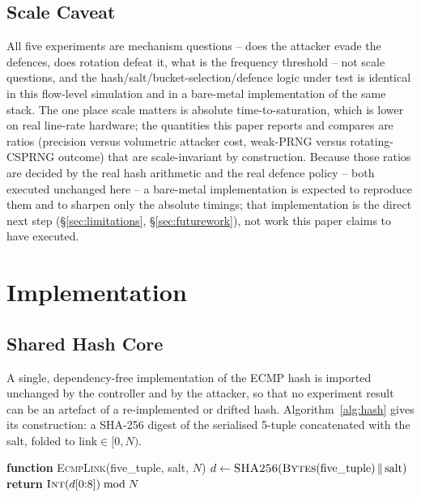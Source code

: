 \documentclass[conference]{IEEEtran}
\begin{document}
\subsection*{Scale Caveat}
All five experiments are mechanism questions -- does the attacker evade the defences, does rotation defeat it,
what is the frequency threshold -- not scale questions, and the hash/salt/bucket-selection/defence logic under
test is identical in this flow-level simulation and in a bare-metal implementation of the same stack. The one
place scale matters is absolute time-to-saturation, which is lower on real line-rate hardware; the quantities
this paper reports and compares are ratios (precision versus volumetric attacker cost, weak-PRNG versus
rotating-CSPRNG outcome) that are scale-invariant by construction. Because those ratios are decided by the real
hash arithmetic and the real defence policy -- both executed unchanged here -- a bare-metal implementation is
expected to reproduce them and to sharpen only the absolute timings; that implementation is the direct next step
(\S\ref{sec:limitations}, \S\ref{sec:futurework}), not work this paper claims to have executed.

\section{Implementation}

\subsection{Shared Hash Core}

A single, dependency-free implementation of the ECMP hash is imported unchanged by the controller and by the
attacker, so that no experiment result can be an artefact of a re-implemented or drifted hash. Algorithm~\ref{alg:hash}
gives its construction: a SHA-256 digest of the serialised 5-tuple concatenated with the salt, folded to
$\mathrm{link} \in [0, N)$.

\begin{algorithm}[t]
\caption{Shared ECMP hash core}
\label{alg:hash}
\begin{algorithmic}[1]
\STATE \textbf{function} \textsc{EcmpLink}(five\_tuple, salt, $N$)
\STATE $d \leftarrow \textsc{SHA256}(\textsc{Bytes}(\mathrm{five\_tuple}) \,\|\, \mathrm{salt})$
\STATE \textbf{return} $\textsc{Int}(d[0{:}8]) \bmod N$
\end{algorithmic}
\end{algorithm}
\end{document}

